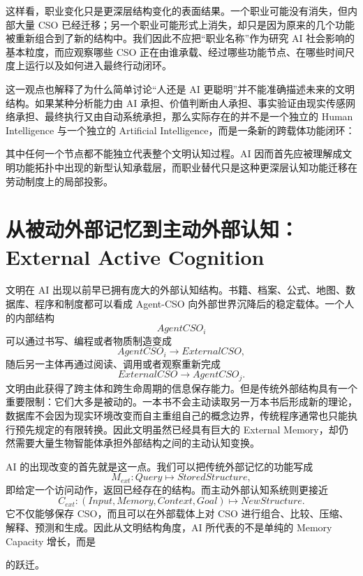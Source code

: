 这样看，职业变化只是更深层结构变化的表面结果。一个职业可能没有消失，但内部大量 CSO 已经迁移；另一个职业可能形式上消失，却只是因为原来的几个功能被重新组合到了新的结构中。我们因此不应把“职业名称”作为研究 AI 社会影响的基本粒度，而应观察哪些 CSO 正在由谁承载、经过哪些功能节点、在哪些时间尺度上运行以及如何进入最终行动闭环。

这一观点也解释了为什么简单讨论“人还是 AI 更聪明”并不能准确描述未来的文明结构。如果某种分析能力由 AI 承担、价值判断由人承担、事实验证由现实传感网络承担、最终执行又由自动系统承担，那么实际存在的并不是一个独立的 Human Intelligence 与一个独立的 Artificial Intelligence，而是一条新的跨载体功能闭环：
\begin{statementbox}
\centering
{}
\end{statementbox}
其中任何一个节点都不能独立代表整个文明认知过程。AI 因而首先应被理解成文明功能拓扑中出现的新型认知承载层，而职业替代只是这种更深层认知功能迁移在劳动制度上的局部投影。

\section{从被动外部记忆到主动外部认知：External Active Cognition}

文明在 AI 出现以前早已拥有庞大的外部认知结构。书籍、档案、公式、地图、数据库、程序和制度都可以看成 Agent-CSO 向外部世界沉降后的稳定载体。一个人的内部结构
\begin{equation}
AgentCSO_{i}
\end{equation}
可以通过书写、编程或者物质制造变成
\begin{equation}
AgentCSO_{i}
\rightarrow
ExternalCSO,
\end{equation}
随后另一主体再通过阅读、调用或者观察重新完成
\begin{equation}
ExternalCSO
\rightarrow
AgentCSO_{j}.
\end{equation}
文明由此获得了跨主体和跨生命周期的信息保存能力。但是传统外部结构具有一个重要限制：它们大多是被动的。一本书不会主动读取另一万本书后形成新的理论，数据库不会因为现实环境改变而自主重组自己的概念边界，传统程序通常也只能执行预先规定的有限转换。因此文明虽然已经具有巨大的 External Memory，却仍然需要大量生物智能体承担外部结构之间的主动认知变换。

AI 的出现改变的首先就是这一点。我们可以把传统外部记忆的功能写成
\begin{equation}
M_{ext}:
Query
\mapsto
StoredStructure,
\end{equation}
即给定一个访问动作，返回已经存在的结构。而主动外部认知系统则更接近
\begin{equation}
C_{ext}:
\left(
Input,
Memory,
Context,
Goal
\right)
\mapsto
NewStructure.
\end{equation}
它不仅能够保存 CSO，而且可以在外部载体上对 CSO 进行组合、比较、压缩、解释、预测和生成。因此从文明结构角度，AI 所代表的不是单纯的 Memory Capacity 增长，而是
\begin{statementbox}
\centering
{}
\end{statementbox}
的跃迁。

